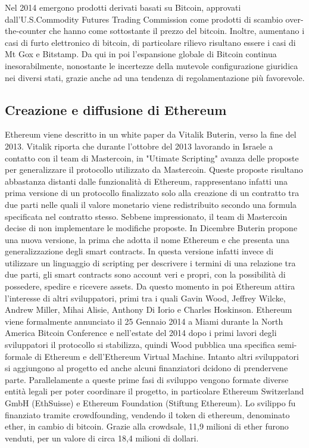 Nel 2014 emergono prodotti derivati basati su Bitcoin, approvati dall'U.S.Commodity Futures Trading Commission come prodotti di scambio over-the-counter che hanno come sottostante il prezzo del bitcoin. Inoltre, aumentano i casi di furto elettronico di bitcoin, di particolare rilievo risultano essere i casi di Mt Gox e Bitstamp. 
Da qui in poi l'espansione globale di Bitcoin continua inesorabilmente, nonostante le incertezze della mutevole configurazione giuridica nei diversi stati, grazie anche ad una tendenza di regolamentazione più favorevole.  

\subsection{Creazione e diffusione di Ethereum}

Ethereum viene descritto in un white paper da Vitalik Buterin, verso la fine del 2013.
Vitalik riporta che durante l'ottobre del 2013 lavorando in Israele a contatto con il team di Mastercoin, in "Utimate Scripting" avanza delle proposte per generalizzare il protocollo utilizzato da Mastercoin. Queste proposte risultano abbastanza distanti dalle funzionalità di Ethereum, rappresentano infatti una prima versione di un protocollo finalizzato solo alla creazione di un contratto tra due parti nelle quali il valore monetario viene redistribuito secondo una formula specificata nel contratto stesso. Sebbene impressionato, il team di Mastercoin decise di non implementare le modifiche proposte. In Dicembre Buterin propone una nuova versione, la prima che adotta il nome Ethereum e che presenta una generalizzazione degli smart contracts. In questa versione infatti invece di utilizzare un linguaggio di scripting per descrivere i termini di una relazione tra due parti, gli smart contracts sono account veri e propri, con la possibilità di possedere, spedire e ricevere assets. Da questo momento in poi Ethereum attira l'interesse di altri sviluppatori, primi tra i quali Gavin Wood, Jeffrey Wilcke, Andrew Miller, Mihai Alisie, Anthony Di Iorio e Charles Hoskinson. 
Ethereum viene formalmente annunciato il 25 Gennaio 2014 a Miami durante la North America Bitcoin Conference  e nell'estate del 2014 dopo i primi lavori degli sviluppatori il protocollo si stabilizza, quindi Wood pubblica una specifica semi-formale di Ethereum e dell'Ethereum Virtual Machine. Intanto altri sviluppatori si aggiungono al progetto ed anche alcuni finanziatori dcidono di prendervene parte.
Parallelamente a queste prime fasi di sviluppo vengono formate diverse entità legali per poter coordinare il progetto, in particolare Ethereum Switzerland GmbH (EthSuisse) e Ethereum Foundation (Stiftung Ethereum). Lo svilippo fu finanziato tramite crowdfounding, vendendo il token di ethereum, denominato ether, in cambio di bitcoin. Grazie alla crowdsale, 11,9 milioni di ether furono venduti, per un valore di circa 18,4 milioni di dollari. 

